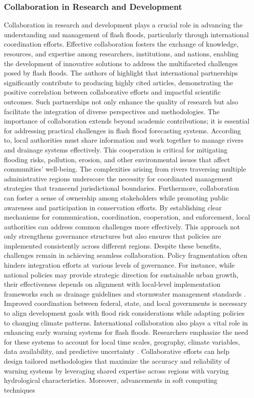 \subsubsection{Collaboration in Research and Development}
Collaboration in research and development plays a crucial role in advancing the understanding and management of flash floods, particularly through international coordination efforts. Effective collaboration fosters the exchange of knowledge, resources, and expertise among researchers, institutions, and nations, enabling the development of innovative solutions to address the multifaceted challenges posed by flash floods. The authors of \citep{Hinge2024} highlight that international partnerships significantly contribute to producing highly cited articles, demonstrating the positive correlation between collaborative efforts and impactful scientific outcomes. Such partnerships not only enhance the quality of research but also facilitate the integration of diverse perspectives and methodologies. The importance of collaboration extends beyond academic contributions; it is essential for addressing practical challenges in flash flood forecasting systems. According to, local authorities must share information and work together to manage rivers and drainage systems effectively. This cooperation is critical for mitigating flooding risks, pollution, erosion, and other environmental issues that affect communities' well-being. The complexities arising from rivers traversing multiple administrative regions underscore the necessity for coordinated management strategies that transcend jurisdictional boundaries. Furthermore, collaboration can foster a sense of ownership among stakeholders while promoting public awareness and participation in conservation efforts. By establishing clear mechanisms for communication, coordination, cooperation, and enforcement, local authorities can address common challenges more effectively. This approach not only strengthens governance structures but also ensures that policies are implemented consistently across different regions. Despite these benefits, challenges remain in achieving seamless collaboration. Policy fragmentation often hinders integration efforts at various levels of governance. For instance, while national policies may provide strategic direction for sustainable urban growth, their effectiveness depends on alignment with local-level implementation frameworks such as drainage guidelines and stormwater management standards \citep{Saad2024}. Improved coordination between federal, state, and local governments is necessary to align development goals with flood risk considerations while adapting policies to changing climate patterns. International collaboration also plays a vital role in enhancing early warning systems for flash floods. Researchers emphasize the need for these systems to account for local time scales, geography, climate variables, data availability, and predictive uncertainty \citep{Henao2022}\citep{Henao2022a}. Collaborative efforts can help design tailored methodologies that maximize the accuracy and reliability of warning systems by leveraging shared expertise across regions with varying hydrological characteristics. Moreover, advancements in soft computing techniques 